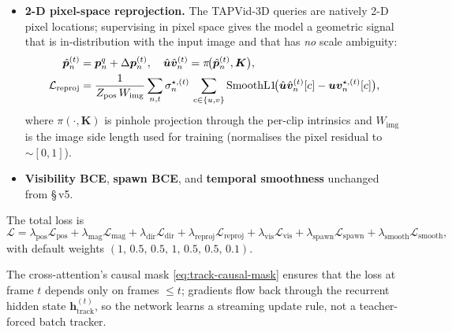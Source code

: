 \documentclass[11pt,a4paper]{article}
\begin{document}
\begin{itemize}
\begin{equation}
              \bigl(1 - \cos\!\bigl(\Delta\bm{p}_n^{(t)},
                                     \Delta\bm{p}_n^{\star,(t)}\bigr)\bigr).
        \end{equation}
        Penalises wrong-direction motion regardless of magnitude. A
        model that gets the direction right but under-shoots magnitude
        is preferred over one that predicts the right magnitude in the
        wrong direction.
  \item \textbf{2-D pixel-space reprojection.} The TAPVid-3D queries are
        natively 2-D pixel locations; supervising in pixel space gives
        the model a geometric signal that is in-distribution with the
        input image and that has \emph{no} scale ambiguity:
        \begin{align}
          \hat{\bm{p}}_n^{(t)} &= \bm{p}_n^{q} + \Delta\bm{p}_n^{(t)},
          \quad
          \hat{\bm{u}}\hat{\bm{v}}_n^{(t)} = \pi\!\bigl(\hat{\bm{p}}_n^{(t)}, \bm{K}\bigr),
          \notag\\
          \mathcal{L}_{\text{reproj}}
            &= \frac{1}{Z_{\text{pos}}\,W_{\text{img}}}\sum_{n,t}
                 \sigma_n^{\star,(t)}\,
                 \sum_{c\in\{u,v\}}
                 \mathrm{SmoothL1}\!\bigl(
                   \hat{\bm{u}}\hat{\bm{v}}_n^{(t)}[c] - \bm{u}\bm{v}_n^{\star,(t)}[c]
                 \bigr),
          \label{eq:track-reproj-loss}
        \end{align}
        where $\pi(\cdot, \bm{K})$ is pinhole projection through the
        per-clip intrinsics and $W_{\text{img}}$ is the image side
        length used for training (normalises the pixel residual to
        $\sim\![0, 1]$).
  \item \textbf{Visibility BCE}, \textbf{spawn BCE}, and \textbf{temporal
        smoothness} unchanged from \S\,v5.
\end{itemize}
The total loss is
\begin{equation}
  \mathcal{L}
    = \lambda_{\text{pos}}\mathcal{L}_{\text{pos}}
    + \lambda_{\text{mag}}\mathcal{L}_{\text{mag}}
    + \lambda_{\text{dir}}\mathcal{L}_{\text{dir}}
    + \lambda_{\text{reproj}}\mathcal{L}_{\text{reproj}}
    + \lambda_{\text{vis}}\mathcal{L}_{\text{vis}}
    + \lambda_{\text{spawn}}\mathcal{L}_{\text{spawn}}
    + \lambda_{\text{smooth}}\mathcal{L}_{\text{smooth}},
\end{equation}
with default weights $(1,\,0.5,\,0.5,\,1,\,0.5,\,0.5,\,0.1)$.

The cross-attention's causal mask \eqref{eq:track-causal-mask}
ensures that the loss at frame $t$ depends only on frames $\le t$;
gradients flow back through the recurrent hidden state
$\bm{h}^{(t)}_{\text{track}}$, so the network learns a streaming
update rule, not a teacher-forced batch tracker.
\end{document}
